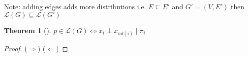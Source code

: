 \documentclass[]{article}
\theoremstyle{mattstyle}
\newtheorem{theorem}{Theorem}[section]
\theoremstyle{definition}
\begin{document}
Note: adding edges adds more distributions i.e. \(E \subseteq E'\) and \(G' = (V, E')\) then \(\mathcal{L}(G) \subseteq \mathcal{L}(G')\)
\begin{theorem}[] 
	\( p \in \mathcal{L}(G) \iff x_i \perp x_{nd(i)} \mid \pi_i\)
\end{theorem}
\begin{proof}
	(\(\Rightarrow\))
	(\(\Leftarrow\))
\end{proof}


\newpage



\end{document}
